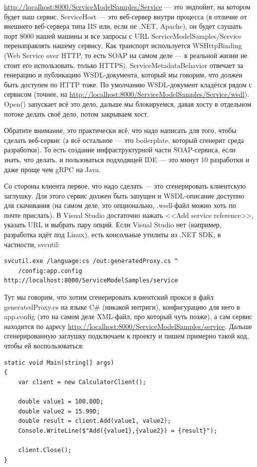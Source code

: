 \documentclass[a5paper]{article}
\begin{document}
\url{http://localhost:8000/ServiceModelSamples/Service} --- это эндпойнт, на котором будет наш сервис. ServiceHost --- это веб-сервер внутри процесса (в отличие от внешнего веб-сервера типа IIS или, если не .NET, Apache), он будет слушать порт 8000 нашей машины и все запросы с URL ServiceModelSamples/Service перенаправлять нашему сервису. Как транспорт используется WSHttpBinding (Web Service over HTTP, то есть SOAP на самом деле --- в реальной жизни не стоит его использовать, только HTTPS). ServiceMetadataBehavior отвечает за генерацию и публикацию WSDL-документа, который мы говорим, что должен быть доступен по HTTP тоже. По умолчанию WSDL-документ кладётся рядом с сервисом (точнее, на \url{http://localhost:8000/ServiceModelSamples/Service/wsdl}). Open() запускает всё это дело, дальше мы блокируемся, давая хосту в отдельном потоке делать своё дело, потом закрываем хост.

Обратите внимание, это практически всё, что надо написать для того, чтобы сделать веб-сервис (а всё остальное --- это boilerplate, который сгенерит среда разработки). То есть создание инфраструктурной части SOAP-сервиса, если знать, что делать, и пользоваться подходящей IDE --- это минут 10 разработки и даже проще чем gRPC на Java.

Со стороны клиента первое, что надо сделать --- это сгенерировать клиентскую заглушку. Для этого сервис должен быть запущен и WSDL-описание доступно для скачивания (на самом деле, это опционально, .wsdl-файл можно хоть по почте прислать). В Visual Studio достаточно нажать <<Add service reference>>, указать URL и выбрать пару опций. Если Visual Studio нет (например, разработка идёт под Linux), есть консольные утилиты из .NET SDK, в частности, svcutil:

\begin{verbatim}
svcutil.exe /language:cs /out:generatedProxy.cs ^
    /config:app.config http://localhost:8000/ServiceModelSamples/service
\end{verbatim}

Тут мы говорим, что хотим сгенерировать клиентский прокси в файл generatedProxy.cs на языке C\# (никакой интриги), конфигурацию для него в app.config (это на самом деле XML-файл, про который чуть позже), а сам сервис находится по адресу \url{http://localhost:8000/ServiceModelSamples/service}. Дальше сгенерированную заглушку подключаем к проекту и пишем примерно такой код, чтобы ей воспользоваться: 

\begin{verbatim}
static void Main(string[] args)
{
    var client = new CalculatorClient();

    double value1 = 100.00D;
    double value2 = 15.99D;
    double result = client.Add(value1, value2);
    Console.WriteLine($"Add({value1},{value2}) = {result}");

    client.Close();
}
\end{verbatim}
\end{document}
